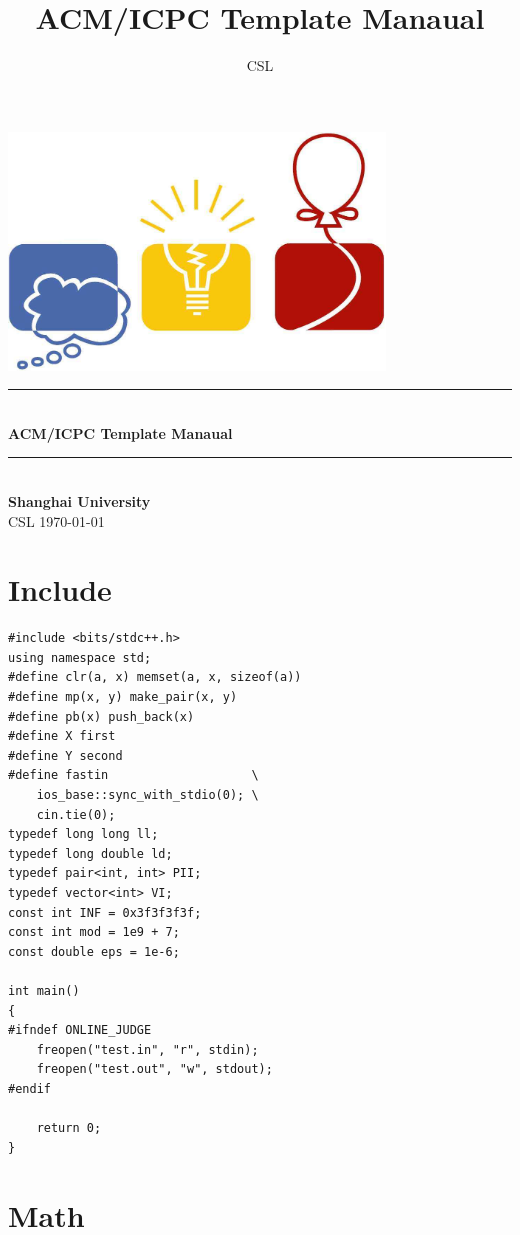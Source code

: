\documentclass[twoside]{article}
\title{ACM/ICPC Template Manaual}
\author{CSL}
\newcommand{\HRule}{\rule{\linewidth}{0.5mm}}
\begin{document}
\small
\begin{titlepage}
\begin{center}
\vspace*{0.5cm}\includegraphics[width=0.75\textwidth]{logo.jpg} \\ [2cm]
\HRule \\ [1cm]
\textbf{\Huge{ACM/ICPC Template Manaual}} \\ [0.5cm]
\HRule \\ [4cm]
\textbf{\Huge{Shanghai University}} \\ [1cm]
\LARGE{CSL}
\vfill
\Large{\today}
\end{center}
\clearpage
\end{titlepage}
\tableofcontents\clearpage
\pagestyle{fancy}
\lfoot{}
\cfoot{\thepage}\rfoot{}
\setcounter{section}{-1}
\setcounter{page}{1}
\clearpage\section{Include}
\begin{lstlisting}
#include <bits/stdc++.h>
using namespace std;
#define clr(a, x) memset(a, x, sizeof(a))
#define mp(x, y) make_pair(x, y)
#define pb(x) push_back(x)
#define X first
#define Y second
#define fastin                    \
    ios_base::sync_with_stdio(0); \
    cin.tie(0);
typedef long long ll;
typedef long double ld;
typedef pair<int, int> PII;
typedef vector<int> VI;
const int INF = 0x3f3f3f3f;
const int mod = 1e9 + 7;
const double eps = 1e-6;

int main()
{
#ifndef ONLINE_JUDGE
    freopen("test.in", "r", stdin);
    freopen("test.out", "w", stdout);
#endif
    
    return 0;
}
\end{lstlisting}
\clearpage\section{Math}
\end{document}
